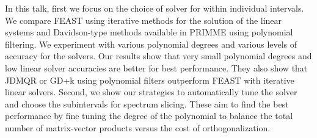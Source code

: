 \documentclass{report}
\begin{document}
In this talk, first we focus on the choice of solver for within
individual intervals. We compare FEAST using iterative methods for the
solution of the linear systems and Davidson-type methods available in
PRIMME using polynomial filtering. We experiment with various polynomial
degrees and various levels of accuracy for the solvers. Our results show
that very small polynomial degrees and low linear solver accuracies are
better for best performance. They also show that JDMQR or GD+k using
polynomial filters outperform FEAST with iterative linear solvers.
Second, we show our strategies to automatically tune the solver and
choose the subintervals for spectrum slicing. These aim to find the best
performance by fine tuning the degree of the polynomial to balance the
total number of matrix-vector products versus the cost of
orthogonalization.
\end{document}

